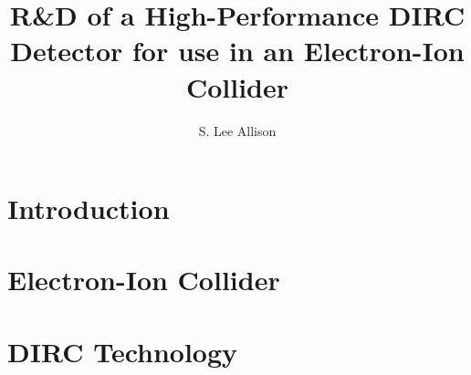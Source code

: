 \documentclass[12pt]{report}
\numberwithin{equation}{chapter}
\begin{document}
\title{R\&D of a High-Performance DIRC Detector for use in an Electron-Ion Collider}

\author{S. Lee Allison}











\beforepreface



\afterpreface

\listofcomments


\chapter{Introduction}
%
\chapter{Electron-Ion Collider}
%
\chapter{DIRC Technology}
%
\end{document}
